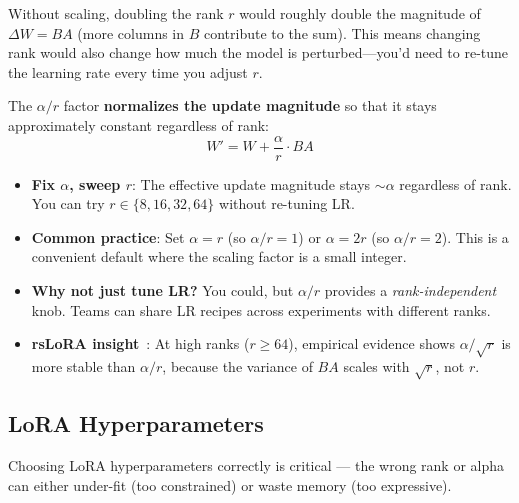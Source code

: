 \begin{intuitionbox}
Without scaling, doubling the rank $r$ would roughly double the magnitude of $\Delta W = BA$ (more columns in $B$ contribute to the sum). This means changing rank would also change how much the model is perturbed---you’d need to re-tune the learning rate every time you adjust $r$.

The $\alpha/r$ factor \textbf{normalizes the update magnitude} so that it stays approximately constant regardless of rank: 
\[
W' = W + \frac{\alpha}{r} \cdot BA
\]

\begin{itemize}
  \item \textbf{Fix $\alpha$, sweep $r$}: The effective update magnitude stays $\sim\alpha$ regardless of rank. You can try $r \in \{8, 16, 32, 64\}$ without re-tuning LR.
  \item \textbf{Common practice}: Set $\alpha = r$ (so $\alpha/r = 1$) or $\alpha = 2r$ (so $\alpha/r = 2$). This is a convenient default where the scaling factor is a small integer.
  \item \textbf{Why not just tune LR?} You could, but $\alpha/r$ provides a \emph{rank-independent} knob. Teams can share LR recipes across experiments with different ranks.
  \item \textbf{rsLoRA insight}~\cite{kalajdzievski2023rslora}: At high ranks ($r \geq 64$), empirical evidence shows $\alpha/\sqrt{r}$ is more stable than $\alpha/r$, because the variance of $BA$ scales with $\sqrt{r}$, not $r$.
\end{itemize}
\end{intuitionbox}

\subsection{LoRA Hyperparameters}
\label{lora-hyperparameters}

Choosing LoRA hyperparameters correctly is critical --- the wrong rank or alpha can either under-fit (too constrained) or waste memory (too expressive).


